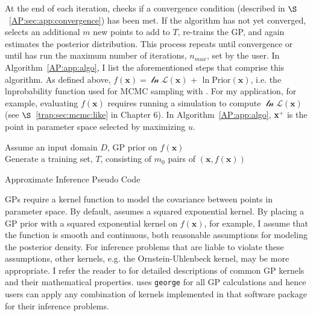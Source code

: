 At the end of each iteration, \approxposterior checks if a convergence condition (described in $\S$~\ref{AP:sec:app:convergence}) has been met. If the algorithm  has not yet converged, \approxposterior selects an additional $m$ new points to add to $T$, re-trains the GP, and again estimates the posterior distribution. This process repeats until convergence or until \approxposterior has run the maximum number of iterations, $n_{max}$, set by the user. In Algorithm~\ref{AP:app:algo}, I list the aforementioned steps that comprise this algorithm. As defined above, $f(\textbf{x}) = \mathcal{\ln L}(\textbf{x})$ + $\ln \mathrm{Prior}(\textbf{x})$, i.e. the lnprobability function used for MCMC sampling with \emcee. For my application, for example, evaluating $f(\textbf{x})$ requires running a \vplanet simulation to compute $\mathcal{\ln L}(\textbf{x})$ (see $\S$~\ref{trap:sec:mcmc:like} in Chapter 6).
 In Algorithm~\ref{AP:app:algo}, \textbf{x}$^+$ is the point in parameter space selected by maximizing $u$. 
\begin{algorithm}
\SetAlgoLined
 Assume an input domain $D$, GP prior on $f(\textbf{x})$ \\
 Generate a training set, $T$, consisting of $m_0$ pairs of $(\textbf{x}, f(\textbf{x}))$ \\
\caption{\approxposterior Approximate Inference Pseudo Code  \label{AP:app:algo}}
\end{algorithm}
 
GPs require a kernel function to model the covariance between points in parameter space. By default, \approxposterior assumes a squared exponential kernel. By placing a GP prior with a squared exponential kernel on $f(\textbf{x})$, for example, I assume that the function is smooth and continuous, both reasonable assumptions for modeling the posterior density. For inference problems that are liable to violate these assumptions, other kernels, e.g. the Ornstein-Uhlenbeck kernel, may be more appropriate. I refer the reader to \citet{Rasmussen2006} for detailed descriptions of common GP kernels and their mathematical properties. \approxposterior uses \texttt{george} \citep{george} for all GP calculations and hence users can apply any combination of kernels implemented in that software package for their inference problems.

